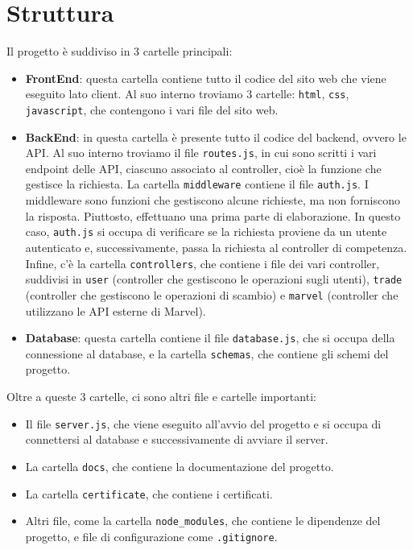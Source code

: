 \documentclass{article}
\begin{document}
\section{Struttura}
    Il progetto è suddiviso in 3 cartelle principali:
    \begin{itemize}
        \item \textbf{FrontEnd}: questa cartella contiene tutto il codice del sito web che viene eseguito lato client. Al suo interno troviamo 3 cartelle: \texttt{html}, \texttt{css}, \texttt{javascript}, che contengono i vari file del sito web.
        \item \textbf{BackEnd}: in questa cartella è presente tutto il codice del backend, ovvero le API. Al suo interno troviamo il file \texttt{routes.js}, in cui sono scritti i vari endpoint delle API, ciascuno associato al controller, cioè la funzione che gestisce la richiesta. La cartella \texttt{middleware} contiene il file \texttt{auth.js}. I middleware sono funzioni che gestiscono alcune richieste, ma non forniscono la risposta. Piuttosto, effettuano una prima parte di elaborazione. In questo caso, \texttt{auth.js} si occupa di verificare se la richiesta proviene da un utente autenticato e, successivamente, passa la richiesta al controller di competenza. Infine, c'è la cartella \texttt{controllers}, che contiene i file dei vari controller, suddivisi in \texttt{user} (controller che gestiscono le operazioni sugli utenti), \texttt{trade} (controller che gestiscono le operazioni di scambio) e \texttt{marvel} (controller che utilizzano le API esterne di Marvel).
        \item \textbf{Database}: questa cartella contiene il file \texttt{database.js}, che si occupa della connessione al database, e la cartella \texttt{schemas}, che contiene gli schemi del progetto.
    \end{itemize}
    
    Oltre a queste 3 cartelle, ci sono altri file e cartelle importanti:
    \begin{itemize}
        \item Il file \texttt{server.js}, che viene eseguito all'avvio del progetto e si occupa di connettersi al database e successivamente di avviare il server.
        \item La cartella \texttt{docs}, che contiene la documentazione del progetto.
        \item La cartella \texttt{certificate}, che contiene i certificati.
        \item Altri file, come la cartella \texttt{node\_modules}, che contiene le dipendenze del progetto, e file di configurazione come \texttt{.gitignore}.
    \end{itemize}
\end{document}
